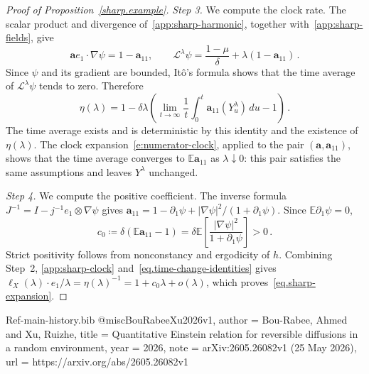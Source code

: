 \documentclass[11pt]{amsart}
\theoremstyle{definition}
\theoremstyle{remark}
\numberwithin{equation}{section}
\newcommand{\E}{\mathbb E}
\renewcommand{\a}{\mathbf a}
\begin{document}
\begin{proof}[Proof of Proposition~\ref{sharp.example}]
\emph{Step 3.} We compute the clock rate. The scalar product and divergence of~\eqref{app:sharp-harmonic}, together with~\eqref{app:sharp-fields}, give
\begin{equation*}
 \a e_1\cdot\nabla\psi=1-\a_{11},
 \qquad
 \mathcal L^\lambda\psi=\frac{1-\mu}{\delta}+\lambda(1-\a_{11})\, .
\end{equation*}
Since $\psi$ and its gradient are bounded, It\^o's formula shows that the time average of $\mathcal L^\lambda\psi$ tends to zero. Therefore
\begin{equation}\label{app:sharp-clock}
 \eta(\lambda)=1-\delta\lambda\left(
 \lim_{t\to\infty}\frac1t\int_0^t\a_{11}(Y^\lambda_u)\,du-1\right)\, .
\end{equation}
The time average exists and is deterministic by this identity and the existence of $\eta(\lambda)$. The clock expansion~\eqref{e:numerator-clock}, applied to the pair $(\a,\a_{11})$, shows that the time average converges to $\E\a_{11}$ as $\lambda\downarrow0$: this pair satisfies the same assumptions and leaves $Y^\lambda$ unchanged.

\emph{Step 4.} We compute the positive coefficient. The inverse formula $J^{-1}=I-j^{-1}e_1\otimes\nabla\psi$ gives $\a_{11}=1-\partial_1\psi+|\nabla\psi|^2/(1+\partial_1\psi)$. Since $\E\partial_1\psi=0$,
\begin{equation*}
 c_0\coloneqq\delta(\E\a_{11}-1)
 =\delta\E\left[\frac{|\nabla\psi|^2}{1+\partial_1\psi}\right]>0\, .
\end{equation*}
Strict positivity follows from nonconstancy and ergodicity of $h$. Combining Step~2, \eqref{app:sharp-clock} and~\eqref{eq.time-change-identities} gives $\ell_X(\lambda)\cdot e_1/\lambda=\eta(\lambda)^{-1}=1+c_0\lambda+o(\lambda)$, which proves~\eqref{eq.sharp-expansion}.
\end{proof}

\begin{filecontents*}{Ref-main-history.bib}
@misc{BouRabeeXu2026v1,
  author = {Bou-Rabee, Ahmed and Xu, Ruizhe},
  title = {Quantitative {Einstein} relation for reversible diffusions in a random environment},
  year = {2026},
  note = {arXiv:2605.26082v1 (25 May 2026)},
  url = {https://arxiv.org/abs/2605.26082v1}
}
\end{filecontents*}


\end{document}
